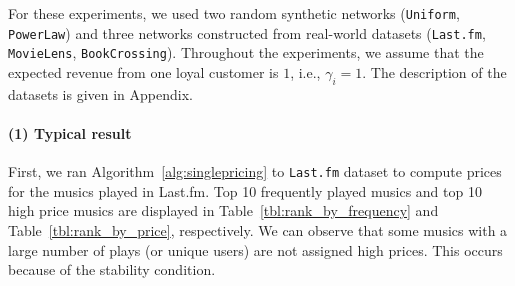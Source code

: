 \documentclass[letterpaper]{article}
\theoremstyle{definition}
\begin{document}
For these experiments, we used two random synthetic networks (\texttt{Uniform}, \texttt{PowerLaw}) and three networks constructed from real-world datasets (\texttt{Last.fm}, \texttt{MovieLens}, \texttt{BookCrossing}).
Throughout the experiments, we assume that the expected revenue from one loyal customer is $1$, i.e., $\gamma_i=1$.
The description of the datasets is given in Appendix.

\paragraph{(1) Typical result}

First, we ran Algorithm~\ref{alg:singlepricing}
to \texttt{Last.fm} dataset to compute prices for the musics played in Last.fm.
Top 10 frequently played musics and top 10 high price musics
are displayed in Table~\ref{tbl:rank_by_frequency} and Table~\ref{tbl:rank_by_price}, respectively.
We can observe that some musics with a large number of plays (or unique users) are not assigned high prices.
This occurs because of the stability condition.
\end{document}
